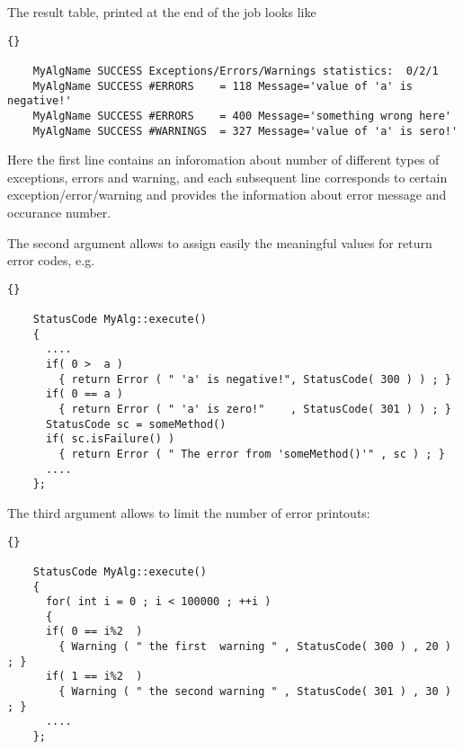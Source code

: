 \documentclass{lhcbnote}
\begin{document}
The result table, printed at the end of the job looks like

\begin{scriptsize}
  \begin{lstlisting}{}

    MyAlgName SUCCESS Exceptions/Errors/Warnings statistics:  0/2/1
    MyAlgName SUCCESS #ERRORS    = 118 Message='value of 'a' is negative!'
    MyAlgName SUCCESS #ERRORS    = 400 Message='something wrong here'
    MyAlgName SUCCESS #WARNINGS  = 327 Message='value of 'a' is sero!'

  \end{lstlisting}
\end{scriptsize}

Here the first line contains an inforomation about number of different types
of exceptions, errors and warning, and each subsequent line corresponds to
certain exception/error/warning and provides the information about error
message and occurance number.


The second argument allows to assign easily the
meaningful values for return error codes, e.g.

\begin{scriptsize}
 \begin{lstlisting}{}

    StatusCode MyAlg::execute()
    {
      ....
      if( 0 >  a )
        { return Error ( " 'a' is negative!", StatusCode( 300 ) ) ; }
      if( 0 == a )
        { return Error ( " 'a' is zero!"    , StatusCode( 301 ) ) ; }
      StatusCode sc = someMethod()
      if( sc.isFailure() )
        { return Error ( " The error from 'someMethod()'" , sc ) ; }
      ....
    };

 \end{lstlisting}
\end{scriptsize}

The third argument allows to limit the number of
error printouts:

\begin{scriptsize}
 \begin{lstlisting}{}

    StatusCode MyAlg::execute()
    {
      for( int i = 0 ; i < 100000 ; ++i )
      {
      if( 0 == i%2  )
        { Warning ( " the first  warning " , StatusCode( 300 ) , 20 ) ; }
      if( 1 == i%2  )
        { Warning ( " the second warning " , StatusCode( 301 ) , 30 ) ; }
      ....
    };

 \end{lstlisting}
\end{scriptsize}
\end{document}
